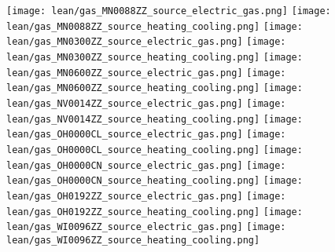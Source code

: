 \texttt{[image: lean/gas\_MN0088ZZ\_source\_electric\_gas.png]}
\texttt{[image: lean/gas\_MN0088ZZ\_source\_heating\_cooling.png]}
\texttt{[image: lean/gas\_MN0300ZZ\_source\_electric\_gas.png]}
\texttt{[image: lean/gas\_MN0300ZZ\_source\_heating\_cooling.png]}
\texttt{[image: lean/gas\_MN0600ZZ\_source\_electric\_gas.png]}
\texttt{[image: lean/gas\_MN0600ZZ\_source\_heating\_cooling.png]}
\texttt{[image: lean/gas\_NV0014ZZ\_source\_electric\_gas.png]}
\texttt{[image: lean/gas\_NV0014ZZ\_source\_heating\_cooling.png]}
\texttt{[image: lean/gas\_OH0000CL\_source\_electric\_gas.png]}
\texttt{[image: lean/gas\_OH0000CL\_source\_heating\_cooling.png]}
\texttt{[image: lean/gas\_OH0000CN\_source\_electric\_gas.png]}
\texttt{[image: lean/gas\_OH0000CN\_source\_heating\_cooling.png]}
\texttt{[image: lean/gas\_OH0192ZZ\_source\_electric\_gas.png]}
\texttt{[image: lean/gas\_OH0192ZZ\_source\_heating\_cooling.png]}
\texttt{[image: lean/gas\_WI0096ZZ\_source\_electric\_gas.png]}
\texttt{[image: lean/gas\_WI0096ZZ\_source\_heating\_cooling.png]}

